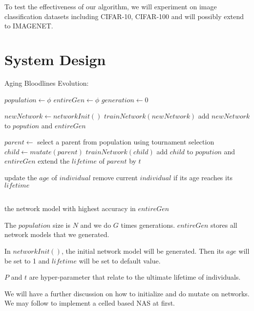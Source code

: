 \documentclass{article}
\begin{document}
\begin{normalsize}
    To test the effectiveness of our algorithm, we will experiment on image classification datasets including CIFAR-10, CIFAR-100 and will possibly extend to IMAGENET.


  \section{System Design}

  \begin{algorithm}[htb]  
    \caption{ Aging Bloodlines Evolution:}
    \begin{algorithmic}[1]  
  
    \State $population\gets \phi$
    \State $entireGen\gets \phi$
    \State $generation\gets 0$
    
    \State $newNetwork\gets networkInit()$
    \State $trainNetwork(newNetwork)$
    \State add $newNetwork$ to $popution$ and $entireGen$
    \EndWhile
    
  
    
      \State $parent\gets$ select a parent from population using tournament selection 
      \State $child \gets mutate(parent)$
      \State $trainNetwork(child)$
      \State add $child$ to $popution$ and $entireGen$
        \State extend the $lifetime$ of $parent$ by $t$
      \EndIf
      
        \State update the $age$ of $individual$
        \State remove current $individual$ if its age reaches its $lifetime$
      \EndFor
      
      
    \EndWhile
    
    
    \\  
    \Return the network model with highest accuracy in $entireGen$
 
  \end{algorithmic}  
  \end{algorithm}  


\end{normalsize}

The $population$ size is $N$ and we do $G$ times generations. $entireGen$ stores all network models that we generated. 
     
In $networkInit()$, the initial network model will be generated. Then its $age $ will be set to 1 and $lifetime$ will be set to default value. 

$P$ and $t$ are hyper-parameter that relate to the ultimate lifetime of individuals.

We will have a further discussion on how to initialize and do mutate on networks. We may follow \cite{DBLP:journals/corr/abs-1802-01548} to implement a celled based NAS at first. 




\end{document}
